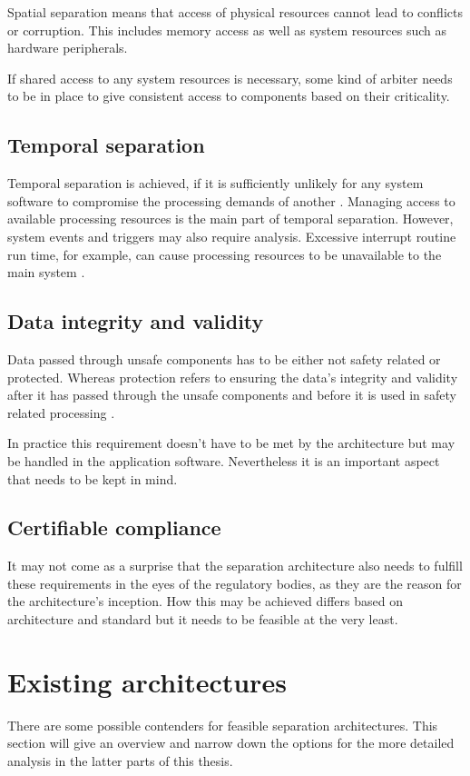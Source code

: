 Spatial separation means that access of physical resources cannot lead to conflicts or corruption. This includes memory access as well as system resources such as hardware peripherals. \cite{Wittenstein.spatial.2017}\cite{perez2013safety}

If shared access to any system resources is necessary, some kind of arbiter needs to be in place to give consistent access to components based on their criticality. 
\subsection{Temporal separation}
Temporal separation is achieved, if it is sufficiently unlikely for any system software to compromise the processing demands of another \cite{Wittenstein.temporal.2017}. 
Managing access to available processing resources is the main part of temporal separation. However, system events and triggers may also require analysis. Excessive interrupt routine run time, for example, can cause processing resources to be unavailable to the main system \cite{Wittenstein.temporal.2017}. 
\subsection{Data integrity and validity}
Data passed through unsafe components has to be either not safety related or protected. Whereas protection refers to ensuring the data's integrity and validity after it has passed through the unsafe components and before it is used in safety related processing \cite{Wittenstein.spatial.2017}.

In practice this requirement doesn't have to be met by the architecture but may be handled in the application software. Nevertheless it is an important aspect that needs to be kept in mind.
\subsection{Certifiable compliance}
It may not come as a surprise that the separation architecture also needs to fulfill these requirements in the eyes of the regulatory bodies, as they are the reason for the architecture's inception.
How this may be achieved differs based on architecture and standard but it needs to be feasible at the very least. 


\section{Existing architectures}
There are some possible contenders for feasible separation architectures. This section will give an overview and narrow down the options for the more detailed analysis in the latter parts of this thesis.
